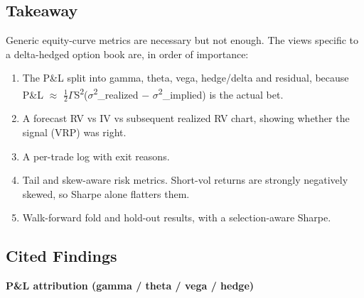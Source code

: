 \documentclass{article}
\begin{document}
\subsection{Takeaway}

Generic equity-curve metrics are necessary but not enough. The views specific to a delta-hedged option book are, in order of importance:

\begin{enumerate}

\item The P\&L split into gamma, theta, vega, hedge/\allowbreak{}delta and residual, because P\&L \ensuremath{\approx} \ensuremath{\frac12}\ensuremath{\Gamma}S\textsuperscript{2}(\ensuremath{\sigma}\textsuperscript{2}\_realized \ensuremath{-} \ensuremath{\sigma}\textsuperscript{2}\_implied) is the actual bet.

\item A forecast RV vs IV vs subsequent realized RV chart, showing whether the signal (VRP) was right.

\item A per-trade log with exit reasons.

\item Tail and skew-aware risk metrics. Short-vol returns are strongly negatively skewed, so Sharpe alone flatters them.

\item Walk-forward fold and hold-out results, with a selection-aware Sharpe.

\end{enumerate}

\subsection{Cited Findings}

\textbf{P\&L attribution (gamma /\allowbreak{} theta /\allowbreak{} vega /\allowbreak{} hedge)}
\end{document}
